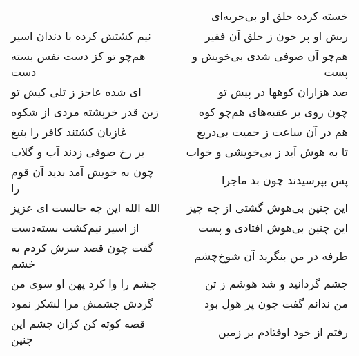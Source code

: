 \begin{center}
\begin{longtable}{l p{0.5cm} r}
&&
خسته کرده حلق او بی‌حربه‌ای
\\
نیم کشتش کرده با دندان اسیر
&&
ریش او پر خون ز حلق آن فقیر
\\
هم‌چو تو کز دست نفس بسته دست
&&
هم‌چو آن صوفی شدی بی‌خویش و پست
\\
ای شده عاجز ز تلی کیش تو
&&
صد هزاران کوهها در پیش تو
\\
زین قدر خرپشته مردی از شکوه
&&
چون روی بر عقبه‌های هم‌چو کوه
\\
غازیان کشتند کافر را بتیغ
&&
هم در آن ساعت ز حمیت بی‌دریغ
\\
بر رخ صوفی زدند آب و گلاب
&&
تا به هوش آید ز بی‌خویشی و خواب
\\
چون به خویش آمد بدید آن قوم را
&&
پس بپرسیدند چون بد ماجرا
\\
الله الله این چه حالست ای عزیز
&&
این چنین بی‌هوش گشتی از چه چیز
\\
از اسیر نیم‌کشت بسته‌دست
&&
این چنین بی‌هوش افتادی و پست
\\
گفت چون قصد سرش کردم به خشم
&&
طرفه در من بنگرید آن شوخ‌چشم
\\
چشم را وا کرد پهن او سوی من
&&
چشم گردانید و شد هوشم ز تن
\\
گردش چشمش مرا لشکر نمود
&&
من ندانم گفت چون پر هول بود
\\
قصه کوته کن کزان چشم این چنین
&&
رفتم از خود اوفتادم بر زمین
\\
\end{longtable}
\end{center}
